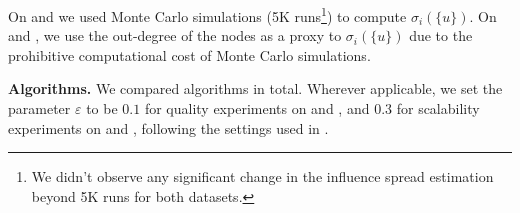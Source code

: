 On \flix and \epi we used Monte Carlo simulations (5K runs\footnote{\scriptsize We didn't observe any significant change in the influence spread estimation beyond 5K runs  for both datasets.}) to compute $\sigma_i(\{u\})$.  On \dblp and \livej, we use the out-degree of the nodes as a proxy to $\sigma_i(\{u\})$ due to the prohibitive computational cost of Monte Carlo simulations.

%

\smallskip\noindent\textbf{Algorithms.}
We compared  algorithms in total. Wherever applicable, we set the parameter $\varepsilon$ to be $0.1$ for quality experiments on \flix and \epi, and $0.3$ for scalability experiments on \dblp and \livej, following the settings used in \cite{tang14}.

